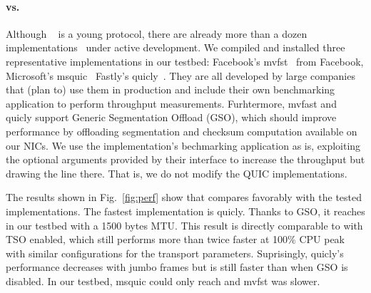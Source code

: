 \paragraph{\tcpls vs. \quic}
Although \quic~\cite{draft-ietf-quic-transport} is a young protocol, there are
already more than a dozen implementations~\cite{marx2020same,quicimplem,yang2020making} under active development. We compiled and installed three representative \quic implementations in our testbed: Facebook's mvfst~\cite{} from Facebook, Microsoft's msquic~\cite{} Fastly's quicly~\cite{}. They are all developed by
large companies that (plan to) use them in production and include their own
benchmarking application to perform throughput measurements. Furhtermore,
mvfast and quicly support Generic Segmentation Offload (GSO), which should improve performance by offloading \udp segmentation and checksum computation available on our NICs. We use the implementation's bechmarking application
as is, exploiting the optional arguments provided by their interface to increase the throughput but drawing the line there. That is, we do not modify the QUIC implementations.

The results shown in Fig.~\ref{fig:perf} show that \tcpls compares favorably
with the tested \quic implementations. The fastest \quic implementation is quicly. Thanks to GSO, it reaches  in our testbed with a 1500 bytes MTU. This result is directly comparable to \tcpls with TSO enabled,
which still performs more than twice faster at 100\% CPU peak with similar configurations for the transport parameters. Suprisingly, quicly's performance decreases with jumbo frames but is still faster than when GSO is disabled. In our testbed, msquic could only reach  and mvfst was slower.






